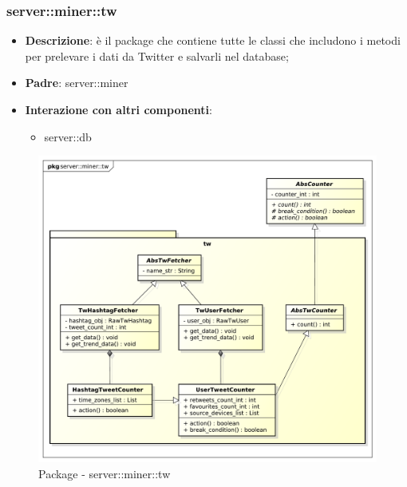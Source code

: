 \subsubsection{server::miner::tw} %
\label{ssub:bdsm_app_server_miner_tw}

\begin{itemize}
	\item \textbf{Descrizione}: è il package che contiene tutte le classi che includono i metodi per prelevare i dati da Twitter e salvarli nel database;
	\item \textbf{Padre}: server::miner
	\item \textbf{Interazione con altri componenti}:
		\begin{itemize}
			\item server::db
		\end{itemize}
\end{itemize}

	\begin{figure}[!htbp]
		\centering
		\centerline{\includegraphics[scale=0.4]{./images/server/miner_tw.pdf}}
		\caption{Package - server::miner::tw}
	\end{figure}

